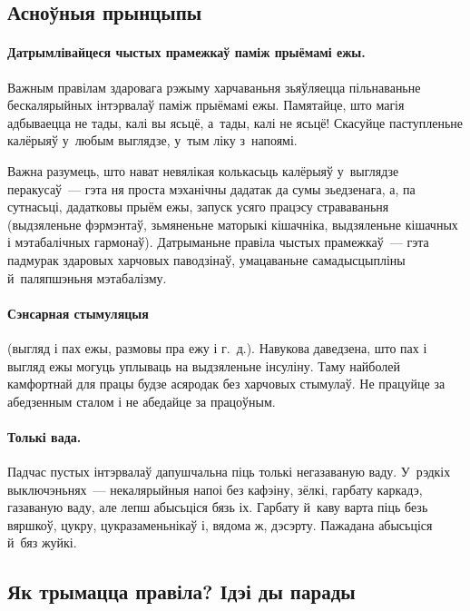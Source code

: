 \subsection{Асноўныя прынцыпы}

\paragraph{Датрымлівайцеся чыстых прамежкаў паміж прыёмамі ежы.}

Важным правілам здаровага рэжыму харчаваньня зьяўляецца пільнаваньне бескалярыйных інтэрвалаў паміж прыёмамі ежы. Памятайце, што магія адбываецца не тады, калі вы ясьцё, а~тады, калі не ясьцё! Скасуйце паступленьне калёрыяў у~любым выглядзе, у~тым ліку з~напоямі.

Важна разумець, што нават невялікая колькасьць калёрыяў у~выглядзе перакусаў~--- гэта ня проста мэханічны дадатак да сумы зьедзенага, а, па сутнасьці, дадатковы прыём ежы, запуск усяго працэсу страваваньня (выдзяленьне фэрмэнтаў, зьмяненьне маторыкі кішачніка, выдзяленьне кішачных і мэтабалічных гармонаў). Датрыманьне правіла чыстых прамежкаў~--- гэта падмурак здаровых харчовых паводзінаў, умацаваньне самадысцыпліны й~паляпшэньня мэтабалізму.

\paragraph{Сэнсарная стымуляцыя} (выгляд і пах ежы, размовы пра ежу і г.~д.). Навукова даведзена, што пах і выгляд ежы могуць уплываць на выдзяленьне інсуліну. Таму найболей камфортнай для працы будзе асяродак без харчовых стымулаў. Не працуйце за абедзенным сталом і не абедайце за працоўным.

\paragraph{Толькі вада.}

Падчас пустых інтэрвалаў дапушчальна піць толькі негазаваную ваду. У~рэдкіх выключэньнях~--- некалярыйныя напоі без кафэіну, зёлкі, гарбату каркадэ, газаваную ваду, але лепш абысьціся бязь іх. Гарбату й~каву варта піць безь вяршкоў, цукру, цукразаменьнікаў і, вядома ж, дэсэрту. Пажадана абысьціся й~бяз жуйкі.

\subsection{Як трымацца правіла? Ідэі ды парады}

